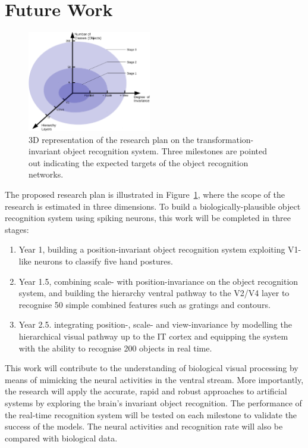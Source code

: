 \documentclass[journal]{journal}
\begin{document}
\section{Future Work} 
\begin{figure}[h!]
	\centering
	\includegraphics[width=0.48\textwidth]{pics/stages.pdf}
	\caption{3D representation of the research plan on the transformation-invariant object recognition system.
	Three milestones are pointed out indicating the expected targets of the object recognition networks.
	}
	\label{Fig:3Dplan}
\end{figure}
The proposed research plan is illustrated in Figure~\ref{Fig:3Dplan}, where the scope of the research is estimated in three dimensions.
To build a biologically-plausible object recognition system using spiking neurons, this work will be completed in three stages:
\begin{enumerate}
	\item Year 1, building a position-invariant object recognition system exploiting V1-like neurons to classify five hand postures. 
	\item Year 1.5, combining scale- with position-invariance on the object recognition system, and building the hierarchy ventral pathway to the V2/V4 layer to recognise 50 simple combined features such as gratings and contours.
	\item Year 2.5. integrating position-, scale- and view-invariance by modelling the hierarchical visual pathway up to the IT cortex and equipping the system with the ability to recognise 200 objects in real time.
\end{enumerate}
 
This work will contribute to the understanding of biological visual processing by means of mimicking the neural activities in the ventral stream.
More importantly, the research will apply the accurate, rapid and robust approaches to artificial systems by exploring the brain's invariant object recognition.
The performance of the real-time recognition system will be tested on each milestone to validate the success of the models.
The neural activities and recognition rate will also be compared with biological data.
\end{document}

